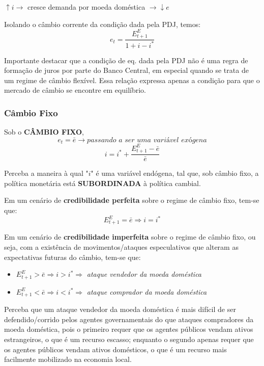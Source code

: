 \documentclass[a4paper,12pt]{article}[abntex2]
\begin{document}
\begin{center}
$\uparrow i \rightarrow$ cresce demanda por moeda doméstica $\rightarrow \downarrow e$
\end{center}

Isolando o câmbio corrente da condição dada pela PDJ, temos:
\[
e_t = \dfrac{E_{t+1}^E}{1 + i - i^*}
\]

Importante destacar que a condição de eq. dada pela PDJ não é uma regra de formação de juros por parte do Banco Central, em especial quando se trata de um regime de câmbio flexível. Essa relação expressa apenas a condição para que o mercado de câmbio se encontre em equilíbrio.

\subsubsection{\textbf{Câmbio Fixo}}

Sob o \textbf{CÂMBIO FIXO},
\[
e_t = \bar{e} \rightarrow \textit{passando a ser uma variável exógena}
\]
\[
i = i^* + \dfrac{E_{t+1}^E - \bar{e}}{\bar{e}}
\]

Perceba a maneira à qual "$i$" é uma variável endógena, tal que, sob câmbio fixo, a política monetária está \textbf{SUBORDINADA} à política cambial.

Em um cenário de \textbf{credibilidade perfeita} sobre o regime de câmbio fixo, tem-se que:
\[
E_{t+1}^E = \bar{e} \Rightarrow i = i^*
\]

Em um cenário de \textbf{credibilidade imperfeita} sobre o regime de câmbio fixo, ou seja, com a existência de movimentos/ataques especulativos que alteram as expectativas futuras do câmbio, tem-se que:
\begin{itemize}
  \item $E_{t+1}^E > \bar{e} \Rightarrow i > i^* \Rightarrow$ \textit{ataque vendedor da moeda doméstica}
  \item $E_{t+1}^E < \bar{e} \Rightarrow i < i^* \Rightarrow$ \textit{ataque comprador da moeda doméstica}
\end{itemize}

Perceba que um ataque vendedor da moeda doméstica é mais difícil de ser defendido/corrido pelos agentes governamentais do que ataques compradores da moeda doméstica, pois o primeiro requer que os agentes públicos vendam ativos estrangeiros, o que é um recurso escasso; enquanto o segundo apenas requer que os agentes públicos vendam ativos domésticos, o que é um recurso mais facilmente mobilizado na economia local.
\end{document}

